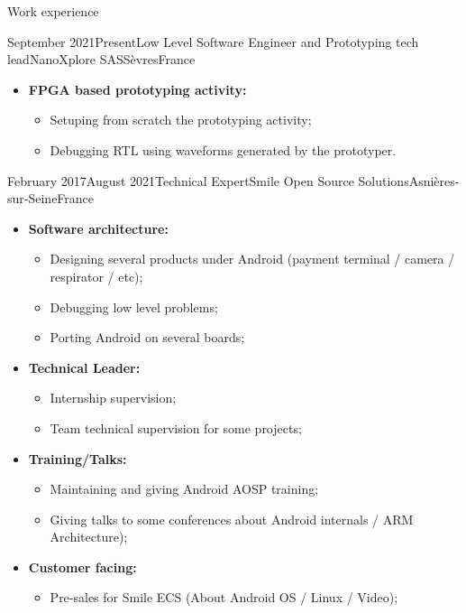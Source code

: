 \documentclass[a4paper, 10pt]{article}
\begin{document}
\begin{section} {Work experience}
\begin{experience}{September 2021}{Present}{Low Level Software Engineer and Prototyping tech lead}{NanoXplore SAS}{S\`{e}vres}{France}
\begin{subexperience}
\begin{itemize}[parsep=0cm,itemsep=0cm,topsep=0cm]
\begin{itemize}[parsep=0cm,itemsep=0cm,topsep=0cm]
				\end{itemize}
			\item \textbf {FPGA based prototyping activity:}
				\begin{itemize}[parsep=0cm,itemsep=0cm,topsep=0cm]
					\item Setuping from scratch the prototyping activity;
					\item Debugging RTL using waveforms generated by the prototyper.
				\end{itemize}
		\end{itemize}
	\end{subexperience}
	\end{experience}

    \begin{experience}{February 2017}{August 2021}{Technical Expert}{Smile Open Source Solutions}{Asni\`{e}res-sur-Seine}{France}
    \begin{subexperience}
    \begin{itemize}[parsep=0cm,itemsep=0cm,topsep=0cm]
		\item \textbf {Software architecture:}
		\begin{itemize}[parsep=0cm,itemsep=0cm,topsep=0cm]
			\item Designing several products under Android (payment terminal / camera / respirator / etc);
			\item Debugging low level problems;
			\item Porting Android on several boards;
		\end{itemize}
		\item \textbf {Technical Leader:}
		\begin{itemize}[parsep=0cm,itemsep=0cm,topsep=0cm]
			\item Internship supervision;
			\item Team technical supervision for some projects;
		\end{itemize}
		\item \textbf {Training/Talks:}
		\begin{itemize}[parsep=0cm,itemsep=0cm,topsep=0cm]
			\item Maintaining and giving Android AOSP training;
			\item Giving talks to some conferences about Android internals / ARM Architecture);
		\end{itemize}
		\item \textbf {Customer facing:}
		\begin{itemize}[parsep=0cm,itemsep=0cm,topsep=0cm]
			\item Pre-sales for Smile ECS (About Android OS / Linux / Video);

\end{itemize}
\end{itemize}
\end{subexperience}
\end{experience}
\end{section}
\end{document}

